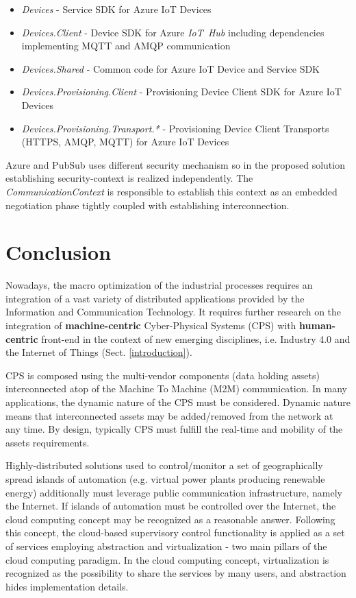 \documentclass{article}
\begin{document}
\begin{itemize}
      \item \textit{Devices} - Service SDK for Azure IoT Devices
      \item \textit{Devices.Client} - Device SDK for Azure \textit{IoT\ Hub} including dependencies implementing MQTT and AMQP communication
      \item \textit{Devices.Shared} - Common code for Azure IoT Device and Service SDK
      \item \textit{Devices.Provisioning.Client} - Provisioning Device Client SDK for Azure IoT Devices
      \item \textit{Devices.Provisioning.Transport.*} - Provisioning Device Client Transports (HTTPS, AMQP, MQTT) for Azure IoT Devices
\end{itemize}

Azure and PubSub uses different security mechanism so in the proposed solution establishing security-context is realized independently. The \textit{CommunicationContext} is responsible to establish this context as an embedded negotiation phase tightly coupled with establishing interconnection.

\section{Conclusion}\label{section.conclusion}

Nowadays, the macro optimization of the industrial processes requires an integration of a vast variety of distributed applications provided by the Information and Communication Technology. It requires further research on the integration of \textbf{machine-centric} Cyber-Physical Systems (CPS) with \textbf{human-centric} front-end in the context of new emerging disciplines, i.e. Industry 4.0 and the Internet of Things (Sect. \ref*{introduction}).

CPS is composed using the multi-vendor components (data holding assets) interconnected atop of the Machine To Machine (M2M) communication. In many applications, the dynamic nature of the CPS must be considered. Dynamic nature means that interconnected assets may be added/removed from the network at any time. By design, typically CPS must fulfill the real-time and mobility of the assets requirements.

Highly-distributed solutions used to control/monitor a set of geographically spread islands of automation (e.g. virtual power plants producing renewable energy) additionally must leverage public communication infrastructure, namely the Internet. If islands of automation must be controlled over the Internet, the cloud computing concept may be recognized as a reasonable answer. Following this concept, the cloud-based supervisory control functionality is applied as a set of services employing abstraction and virtualization - two main pillars of the cloud computing paradigm. In the cloud computing concept, virtualization is recognized as the possibility to share the services by many users, and abstraction hides implementation details.
\end{document}
